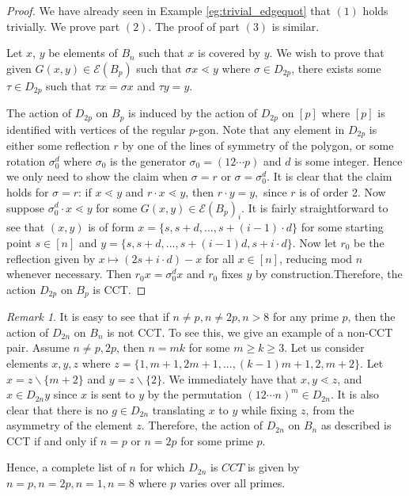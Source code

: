 \documentclass[smallextended, envcountsame, numbook]{svjour3}
\theoremstyle{plain}
\theoremstyle{definition}
\theoremstyle{remark}
\newtheorem{rmk}[thm]{Remark}
\numberwithin{equation}{section}
\begin{document}
\building*

\begin{proof}
We have already seen in Example \ref{eg:trivial_edgequot} that $(1)$ holds trivially. We prove part $(2)$. The proof of part $(3)$ is similar. 

Let $x$, $y$ be elements of $B_n$ such that $x$ is covered by $y$.  We wish to prove that given $G(x, y) \in \mathcal E (B_p)$ such that $\sigma x \lessdot y$ where $\sigma \in D_{2p}$, there exists some $\tau \in D_{2p}$ such that $\tau x = \sigma x$ and $\tau y = y$. 

The action of $D_{2p}$ on $B_p$ is induced by the action of $D_{2p}$ on $[p]$ where $[p]$ is identified with vertices of the regular $p$-gon. Note that any element in $D_{2p}$ is either some reflection $r$ by one of the lines of symmetry of the polygon, or some rotation $\sigma_0^{d} $ where $\sigma_0$ is the generator $\sigma_0 = (12 \cdots p)$ and $d$ is some integer. Hence we only need to show the claim when $\sigma = r$ or $\sigma = \sigma_0^d$. It is clear that the claim holds for $\sigma = r$: if $x \lessdot y$ and $r \cdot x \lessdot y$, then $r \cdot y = y,$ since $r$ is of order 2. Now suppose $\sigma_0^d \cdot x \lessdot y$ for some $G(x,y) \in \mathcal E(B_p)_i$.  It is fairly straightforward to see that $(x, y)$ is of form $x = \{s, s+d, ..., s+(i-1)\cdot d\}$ for some starting point $s \in [n]$ and $y = \{s, s+d, ..., s+(i-1)d, s + i \cdot d\}$. Now let $r_0$ be the reflection given by $x \mapsto (2s+ i \cdot d)-x$ for all $x \in [n]$, reducing mod $n$ whenever necessary. Then $r_0 x = \sigma_0^d x$ and $r_0$ fixes $y$ by construction.Therefore, the action $D_{2p}$ on $B_p$ is CCT. 
\end{proof}


\begin{rmk}
\label{rem:iff_dihedral_cct}
It is easy to see that if $n \neq p,n \neq 2p, n >8$ for any prime $p$, then the action of $D_{2n}$ on $B_n$ is not CCT. To see this, we give an example of a non-CCT pair. Assume $n \ne p, 2 p$, then $n = mk$ for some $m \ge k \ge 3$. Let us consider elements $x, y, z$ where $z = \{1, m+1, 2m+1, ..., (k-1)m+1, 2, m+2\}$. Let $x = z \backslash \{m+2\}$ and $y = z \backslash \{2\}$. We immediately have that $x, y \lessdot z$, and $x \in D_{2n} y$ since $x$ is sent to $y$ by the permutation $(12\cdots n)^m \in D_{2n}$. It is also clear that there is no $g \in D_{2n}$ translating $x$ to $y$ while fixing $z$, from the asymmetry of the element $z$. Therefore, the action of $D_{2n}$ on $B_n$ as described is CCT if and only if $n =p$ or $n = 2p$ for some prime $p$.

Hence, a complete list of $n$ for which $D_{2n}$ is $CCT$ is given by $n = p,n = 2p, n = 1, n = 8$ where $p$ varies over all primes.
\end{rmk}
\end{document}
